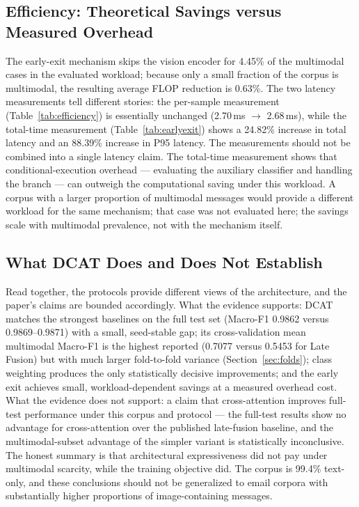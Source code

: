 \documentclass[10pt,twoside]{article}
\begin{document}
\subsection{Efficiency: Theoretical Savings versus Measured Overhead}\label{sec:disc-efficiency}

The early-exit mechanism skips the vision encoder for 4.45\% of the multimodal cases in the evaluated workload; because only a small fraction of the corpus is multimodal, the resulting average FLOP reduction is 0.63\%. The two latency measurements tell different stories: the per-sample measurement (Table~\ref{tab:efficiency}) is essentially unchanged (2.70\,ms $\rightarrow$ 2.68\,ms), while the total-time measurement (Table~\ref{tab:earlyexit}) shows a 24.82\% increase in total latency and an 88.39\% increase in P95 latency. The measurements should not be combined into a single latency claim. The total-time measurement shows that conditional-execution overhead --- evaluating the auxiliary classifier and handling the branch --- can outweigh the computational saving under this workload. A corpus with a larger proportion of multimodal messages would provide a different workload for the same mechanism; that case was not evaluated here; the savings scale with multimodal prevalence, not with the mechanism itself.

\subsection{What DCAT Does and Does Not Establish}\label{sec:disc-summary}

Read together, the protocols provide different views of the architecture, and the paper's claims are bounded accordingly. What the evidence supports: DCAT matches the strongest baselines on the full test set (Macro-F1 0.9862 versus 0.9869--0.9871) with a small, seed-stable gap; its cross-validation mean multimodal Macro-F1 is the highest reported (0.7077 versus 0.5453 for Late Fusion) but with much larger fold-to-fold variance (Section~\ref{sec:folds}); class weighting produces the only statistically decisive improvements; and the early exit achieves small, workload-dependent savings at a measured overhead cost. What the evidence does not support: a claim that cross-attention improves full-test performance under this corpus and protocol --- the full-test results show no advantage for cross-attention over the published late-fusion baseline, and the multimodal-subset advantage of the simpler variant is statistically inconclusive. The honest summary is that architectural expressiveness did not pay under multimodal scarcity, while the training objective did. The corpus is 99.4\% text-only, and these conclusions should not be generalized to email corpora with substantially higher proportions of image-containing messages.
\end{document}
